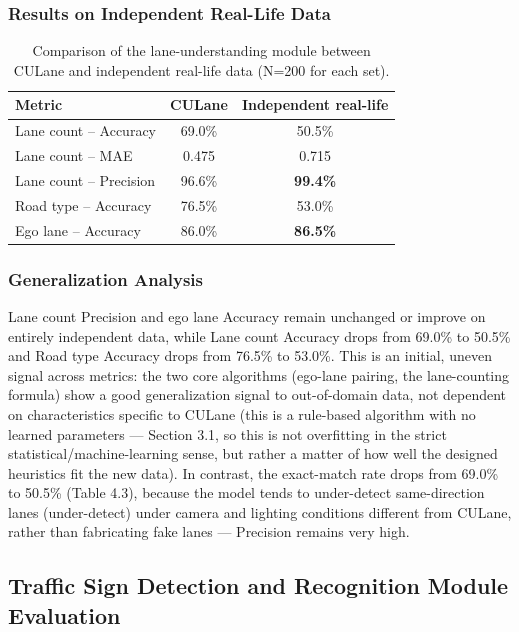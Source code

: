 \documentclass[12pt,a4paper]{report}
\begin{document}
\subsubsection*{Results on Independent Real-Life Data}

\begin{table}[htbp]
    \centering
    \small
    \caption{Comparison of the lane-understanding module between CULane and independent real-life data (N=200 for each set).}
    \label{tab:4.3}
    \begin{tabular}{@{}p{5.5cm}cc@{}}
        \toprule
        \textbf{Metric} & \textbf{CULane} & \textbf{Independent real-life} \\
        \midrule
        Lane count -- Accuracy  & 69.0\% & 50.5\% \\
        Lane count -- MAE       & 0.475  & 0.715 \\
        Lane count -- Precision & 96.6\% & \textbf{99.4\%} \\
        Road type -- Accuracy   & 76.5\% & 53.0\% \\
        Ego lane -- Accuracy    & 86.0\% & \textbf{86.5\%} \\
        \bottomrule
    \end{tabular}
\end{table}

\subsubsection*{Generalization Analysis}

Lane count Precision and ego lane Accuracy remain unchanged or improve on entirely independent data, while Lane count Accuracy drops from 69.0\% to 50.5\% and Road type Accuracy drops from 76.5\% to 53.0\%. This is an initial, uneven signal across metrics: the two core algorithms (ego-lane pairing, the lane-counting formula) show a good generalization signal to out-of-domain data, not dependent on characteristics specific to CULane (this is a rule-based algorithm with no learned parameters --- Section 3.1, so this is not overfitting in the strict statistical/machine-learning sense, but rather a matter of how well the designed heuristics fit the new data). In contrast, the exact-match rate drops from 69.0\% to 50.5\% (Table 4.3), because the model tends to under-detect same-direction lanes (under-detect) under camera and lighting conditions different from CULane, rather than fabricating fake lanes --- Precision remains very high.

\subsection{Traffic Sign Detection and Recognition Module Evaluation}
\end{document}
